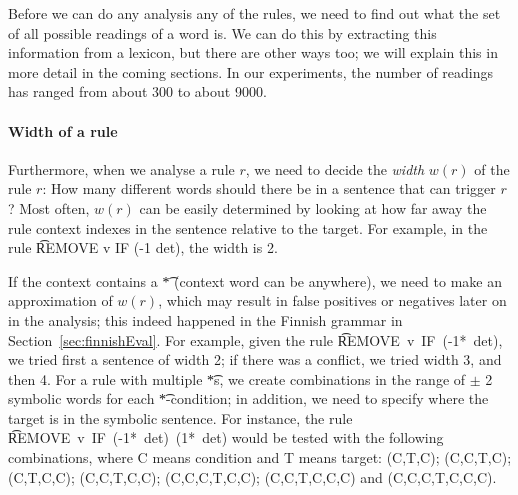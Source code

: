 Before we can do any analysis any of the rules, we need to find out what the set of all possible readings of a word is. We can do this by extracting this information from a lexicon, but there are other ways too; we will explain this in more detail in the coming sections. In our experiments, the number of readings has ranged from about 300 to about 9000. 

\paragraph{Width of a rule}
Furthermore, when we analyse a rule $r$, we need to decide the {\em width} $w(r)$ of the rule $r$: How many different words should there be in a sentence that can trigger $r$? Most often, $w(r)$ can be easily determined by looking at how far away the rule context indexes in the sentence relative to the target. For example, in the rule \t{REMOVE v IF (-1 det)}, the width is 2.

If the context contains a \t{*} (context word can be anywhere),
we need to make an approximation of $w(r)$, which may result in false positives or negatives later on in the analysis; this indeed happened in the Finnish grammar in Section~\ref{sec:finnishEval}. %
For example, given the rule \t{REMOVE~v~IF~(-1*~det)}, 
we tried first a sentence of width 2; if there was a conflict, we tried width 3, and then 4. For a rule with multiple \t{*}s, we create combinations in the range of $\pm$ 2 symbolic words for each \t{*}-condition; 
in addition, we need to specify where the target is in the symbolic sentence. 
For instance, the rule \t{REMOVE~v~IF~(-1*~det)~(1*~det)} would be tested 
with the following combinations, where C means condition and T means target:
(C,T,C); 
(C,C,T,C); 
(C,T,C,C); 
(C,C,T,C,C); 
(C,C,C,T,C,C); 
(C,C,T,C,C,C) and
(C,C,C,T,C,C,C).



